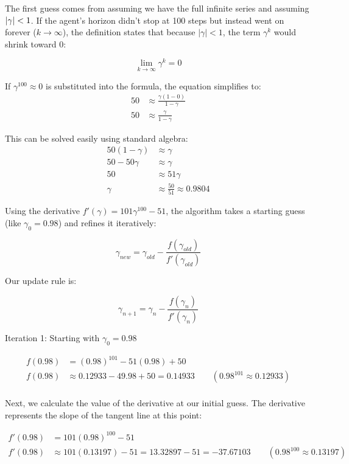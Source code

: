 The first guess comes from assuming we have the full infinite series and assuming $\left\lvert\gamma\right\rvert < 1$. If the agent's horizon didn't stop at 100 steps but instead went on forever ($k \to \infty$), the definition states that because $\vert{}\gamma\vert{} < 1$, the term $\gamma^{k}$ would shrink toward $0$:

$$\lim_{k \to \infty} \gamma^k = 0$$

If $\gamma^{100} \approx 0$ is substituted into the formula, the equation simplifies to:
\begin{align*}
    50 &\approx \frac{\gamma(1 - 0)}{1 - \gamma} \\ 
    50 &\approx \frac{\gamma}{1 - \gamma}
\end{align*}

This can be solved easily using standard algebra:
\begin{align*}
    50(1 - \gamma) &\approx \gamma \\ 
    50 - 50\gamma &\approx \gamma \\ 
    50 &\approx 51\gamma \\ 
    \gamma &\approx \frac{50}{51} \approx 0.9804
\end{align*}

Using the derivative $f'(\gamma) = 101\gamma^{100} - 51$, the algorithm takes a starting guess (like $\gamma_0 = 0.98$) and refines it iteratively:

$$\gamma_{new} = \gamma_{old} - \frac{f(\gamma_{old})}{f'(\gamma_{old})}$$

Our update rule is:

$$\gamma_{n+1} = \gamma_n - \frac{f(\gamma_n)}{f'(\gamma_n)}$$

Iteration 1: Starting with $\gamma_0 = 0.98$

\begin{align*}
f(0.98) &= (0.98)^{101} - 51(0.98) + 50 \\ 
f(0.98) &\approx 0.12933 - 49.98 + 50 = 0.14933 \qquad (0.98^{101} \approx 0.12933) \\
\end{align*}

Next, we calculate the value of the derivative at our initial guess. The derivative represents the slope of the tangent line at this point:

\begin{align*}
    f'(0.98) &= 101(0.98)^{100} - 51 \\ 
    f'(0.98) &\approx 101(0.13197) - 51 = 13.32897 - 51 = -37.67103 \qquad (0.98^{100} \approx 0.13197)
\end{align*}

